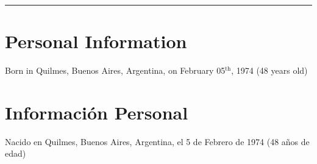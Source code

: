 \hrule

\ifeng

\ifres
\vspace{0.5cm}
\else
\section*{Personal Information}
Born in Quilmes, Buenos Aires, Argentina, on February 05$^\mathrm{th}$, 1974 (48 years old)\\
\fi

\else

\ifres
\vspace{0.5cm}
\else
\section*{Información Personal}
\fi
Nacido en Quilmes, Buenos Aires, Argentina, el 5 de Febrero de 1974 (48 años de edad)\\
\fi